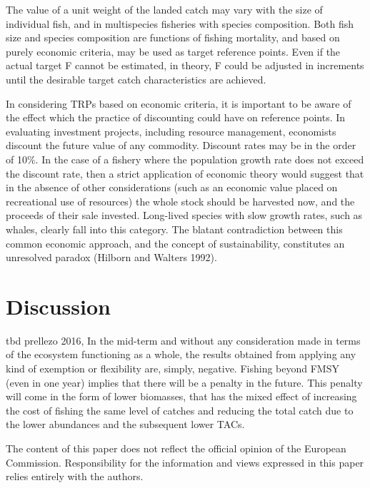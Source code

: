 \documentclass[12pt,oneline,a4paper,numbib]{ouparticle}
\begin{document}
The value of a unit weight of the landed catch may vary with the size of individual fish, and in multispecies fisheries with species composition. Both fish size and species composition are functions of fishing mortality, and based on purely economic criteria, may be used as target reference points. Even if the actual target F cannot be estimated, in theory, F could be adjusted in increments until the desirable target catch characteristics are achieved.

In considering TRPs based on economic criteria, it is important to be aware of the effect which the practice of discounting could have on reference points. In evaluating investment projects, including resource management, economists discount the future value of any commodity. Discount rates may be in the order of 10\%. In the case of a fishery where the population growth rate does not exceed the discount rate, then a strict application of economic theory would suggest that in the absence of other considerations (such as an economic value placed on recreational use of resources) the whole stock should be harvested now, and the proceeds of their sale invested. Long-lived species with slow growth rates, such as whales, clearly fall into this category. The blatant contradiction between this common economic approach, and the concept of sustainability, constitutes an unresolved paradox (Hilborn and Walters 1992).

\section{Discussion}
\label{sec4}
tbd
prellezo 2016, In the mid-term and without any consideration made in terms of the ecosystem functioning as a whole, the results obtained from applying any kind of exemption or flexibility are, simply, negative. Fishing beyond FMSY (even in one year) implies that there will be a penalty in the future. This penalty will come in the form of lower biomasses, that has the mixed effect of increasing the cost of fishing the same level of catches and reducing the total catch due to the lower abundances and the subsequent lower TACs.

\begin{notes}[Acknowledgements]
The content of this paper does not reflect the official opinion of the European Commission. Responsibility for the information and views expressed in this paper relies entirely with the authors.
\end{notes}

\newpage


\end{document}
